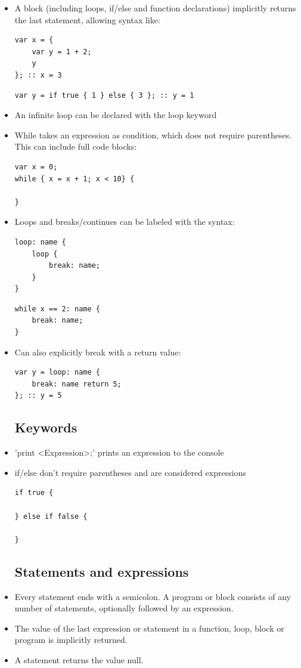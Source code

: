 \documentclass[12pt,a4paper]{article}
\begin{document}
\begin{itemize}
\subsection{Loops and blocks}
\item A block (including loops, if/else and function declarations) implicitly returns the last statement, allowing syntax like:
\begin{lstlisting}
var x = {
    var y = 1 + 2;
    y
}; :: x = 3
\end{lstlisting}
\begin{lstlisting}
var y = if true { 1 } else { 3 }; :: y = 1
\end{lstlisting}
\item An infinite loop can be declared with the loop keyword  
\item While takes an expression as condition, which does not require parentheses. This can include full code blocks:
\begin{lstlisting}
var x = 0;
while { x = x + 1; x < 10} {

}
\end{lstlisting}

\item Loops and breaks/continues can be labeled with the syntax:
\begin{lstlisting}
loop: name {
    loop {
        break: name;
    }
}
\end{lstlisting}
\begin{lstlisting}
while x == 2: name {
    break: name;
}
\end{lstlisting}
\item Can also explicitly break with a return value:
\begin{lstlisting}
var y = loop: name {
    break: name return 5;
}; :: y = 5
\end{lstlisting}

\subsection{Keywords}
\item 'print <Expression>;' prints an expression to the console
\item if/else don't require parentheses and are considered expressions
\begin{lstlisting}
if true {

} else if false {

}
\end{lstlisting}

\subsection{Statements and expressions}
\item Every statement ends with a semicolon. A program or block consists of any number of statements, optionally followed by an expression.
\item The value of the last expression or statement in a function, loop, block or program is implicitly returned. 
\item A statement returns the value null.
\end{itemize}
\end{document}
